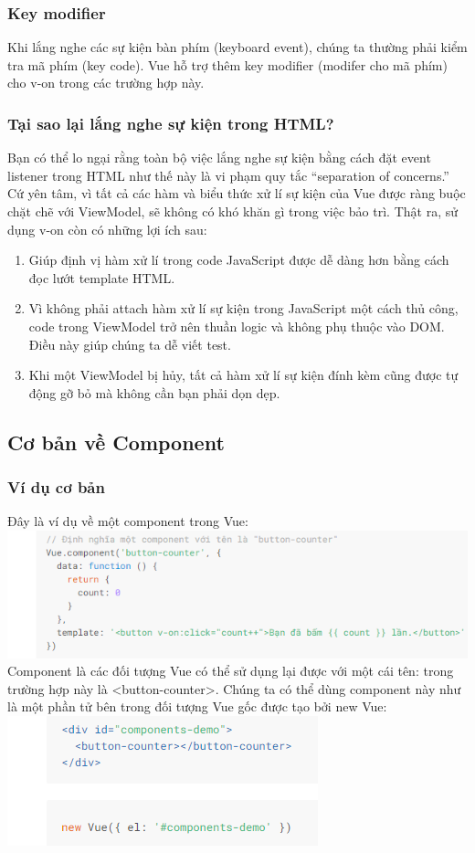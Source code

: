\documentclass[12pt,a4paper]{report}
\begin{document}
\subsubsection{Key modifier} Khi lắng nghe các sự kiện bàn phím (keyboard event), chúng ta thường phải kiểm tra mã phím (key code). Vue hỗ trợ thêm key modifier (modifer cho mã phím) cho v-on trong các trường hợp này.
\subsubsection{Tại sao lại lắng nghe sự kiện trong HTML?} Bạn có thể lo ngại rằng toàn bộ việc lắng nghe sự kiện bằng cách đặt event listener trong HTML như thế này là vi phạm quy tắc “separation of concerns.” Cứ yên tâm, vì tất cả các hàm và biểu thức xử lí sự kiện của Vue được ràng buộc chặt chẽ với ViewModel, sẽ không có khó khăn gì trong việc bảo trì. Thật ra, sử dụng v-on còn có những lợi ích sau:
\begin{enumerate}
	\item Giúp định vị hàm xử lí trong code JavaScript được dễ dàng hơn bằng cách đọc lướt template HTML.
	\item Vì không phải attach hàm xử lí sự kiện trong JavaScript một cách thủ công, code trong ViewModel trở nên thuần logic và không phụ thuộc vào DOM. Điều này giúp chúng ta dễ viết test.
	\item Khi một ViewModel bị hủy, tất cả hàm xử lí sự kiện đính kèm cũng được tự động gỡ bỏ mà không cần bạn phải dọn dẹp.
\end{enumerate}
\subsection{Cơ bản về Component}
\subsubsection{Ví dụ cơ bản} Đây là ví dụ về một component trong Vue:
\\\includegraphics[scale=1]{58}\\Component là các đối tượng Vue có thể sử dụng lại được với một cái tên: trong trường hợp này là <button-counter>. Chúng ta có thể dùng component này như là một phần tử bên trong đối tượng Vue gốc được tạo bởi new Vue: \\\includegraphics[scale=1]{59}
\end{document}
